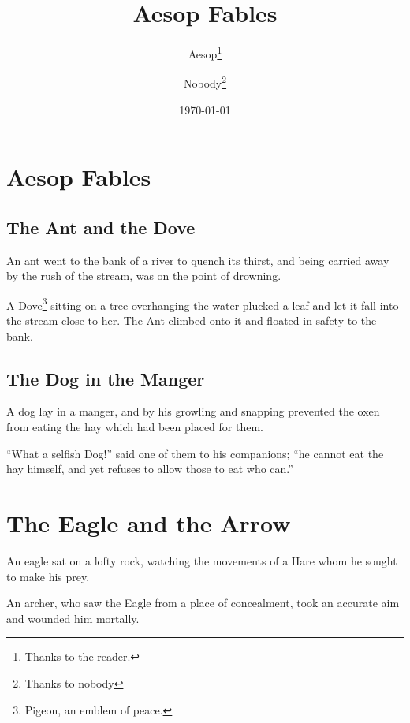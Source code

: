 \documentclass{report}
\title{Aesop Fables}
\author{Aesop\thanks{Thanks to the reader.}
       \and Nobody\thanks{Thanks to nobody}}
\date{\today}
\begin{document}
\maketitle
\tableofcontents
\chapter{Aesop Fables}
\section{The Ant and the Dove}

An ant went to the bank of a river to quench its thirst, and
being carried away by the rush of the stream, was on the
point of drowning.

A Dove\footnote{Pigeon, an emblem of peace.}
sitting on a tree overhanging the water plucked a
leaf and let it fall into the stream close to her. The Ant
climbed onto it and floated in safety to the bank.

\section{The Dog in the Manger}

A dog lay in a manger, and by his growling and snapping
prevented the oxen from eating the hay which had been
placed for them.

``What a selfish Dog!'' said one of them to his companions;
``he cannot eat the hay himself, and yet refuses to allow
those to eat who can.''

\chapter{The Eagle and the Arrow}

An eagle sat on a lofty rock, watching the movements of a
Hare whom he sought to make his prey.

An archer, who saw the Eagle from a place of concealment,
took an accurate aim and wounded him mortally.
\end{document}
